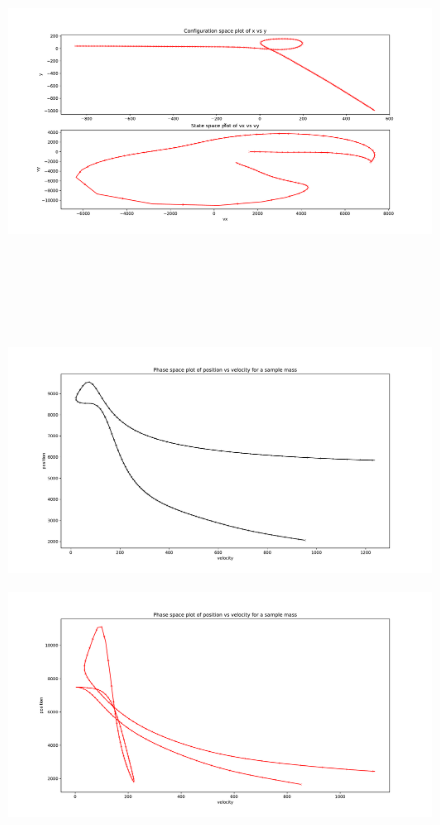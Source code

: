 \documentclass[cm, 10pt]{article}
\begin{document}
\begin{enumerate}
\begin{figure}[H]
\begin{minipage}{.49\linewidth}
        \includegraphics[width=\linewidth, height = 11cm]{m2space.pdf}
      \end{minipage}
    \end{figure}
    \begin{figure}[H]
      \centering
      \includegraphics[width=\linewidth]{m1phase.pdf}
    \end{figure}
    \begin{figure}[H]
      \centering
      \includegraphics[width=\linewidth]{m2phase.pdf}
    \end{figure}
\end{enumerate}
\end{document}
